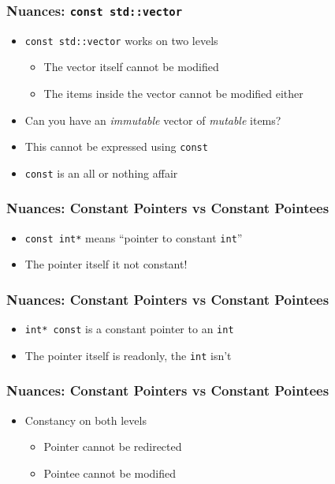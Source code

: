 \begin{frame}
  \frametitle{Nuances: \texttt{const std::vector}}
  \begin{itemize}
    \item \texttt{const std::vector} works on two levels
          \begin{itemize}
            \item The vector itself cannot be modified
            \item The items inside the vector cannot be modified either
          \end{itemize}
    \item Can you have an \emph{immutable} vector of \emph{mutable} items?
    \item This cannot be expressed using \texttt{const}
    \item \texttt{const} is an all or nothing affair
  \end{itemize}
\end{frame}

\begin{frame}
  \frametitle{Nuances: Constant Pointers vs Constant Pointees}
  \begin{itemize}
    \item \texttt{const int*} means ``pointer to constant \texttt{int}''
    \item The pointer itself it not constant!
  \end{itemize}
\end{frame}

\begin{frame}
  \frametitle{Nuances: Constant Pointers vs Constant Pointees}
  \begin{itemize}
    \item \texttt{int* const} is a constant pointer to an \texttt{int}
    \item The pointer itself is readonly, the \texttt{int} isn't
  \end{itemize}
\end{frame}

\begin{frame}
  \frametitle{Nuances: Constant Pointers vs Constant Pointees}
  \begin{itemize}
    \item Constancy on both levels
          \begin{itemize}
            \item Pointer cannot be redirected
            \item Pointee cannot be modified
          \end{itemize}
  \end{itemize}
\end{frame}






